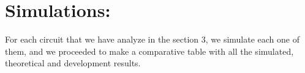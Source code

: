 \section{Simulations:}

For each circuit that we have analyze in the section 3, we simulate each one of them, and we proceeded to make a comparative table with all the simulated, theoretical and development results.


